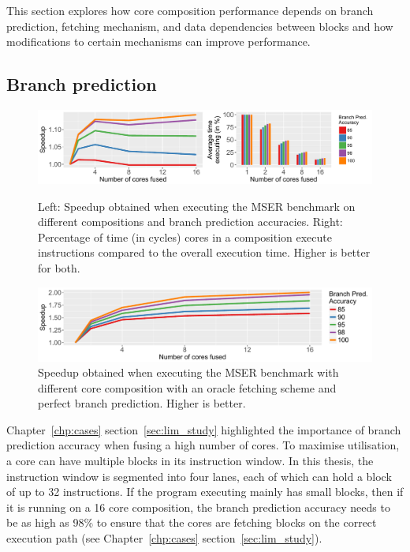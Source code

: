 This section explores how core composition performance depends on branch prediction, fetching mechanism, and data dependencies between blocks and how modifications to certain mechanisms can improve performance.
\vspace{-1em}
\subsection{Branch prediction}
\begin{figure}[t]
    \centering
    \includegraphics[width=1\textwidth]{chapter3/graphics/motiv_p1.pdf}
    \caption{Left: Speedup obtained when executing the MSER benchmark on different compositions and branch prediction accuracies.
	Right: Percentage of time (in cycles) cores in a composition execute instructions compared to the overall execution time. Higher is better for both.}
    \label{fig:mser_motiv}
    \centering
    \includegraphics[width=1\textwidth]{chapter3/graphics/perfect_fetch_motiv2.pdf}
    \caption{Speedup obtained when executing the MSER benchmark with different core composition with an oracle fetching scheme and perfect branch prediction. Higher is better. }
    \label{fig:motivation_fetch}
	\vspace{1em}
\end{figure}
Chapter~\ref{chp:cases} section~\ref{sec:lim_study} highlighted the importance of branch prediction accuracy when fusing a high number of cores.
To maximise utilisation, a core can have multiple blocks in its instruction window.
In this thesis, the instruction window is segmented into four lanes, each of which can hold a block of up to 32 instructions.
If the program executing mainly has small blocks, then if it is running on a 16 core composition, the branch prediction accuracy needs to be as high as 98\% to ensure that the cores are fetching blocks on the correct execution path (see Chapter~\ref{chp:cases} section~\ref{sec:lim_study}).

